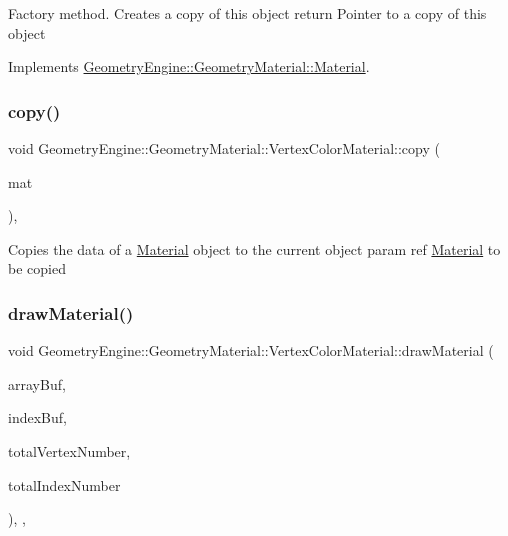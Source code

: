 Factory method. Creates a copy of this object return Pointer to a copy of this object 

Implements \mbox{\hyperlink{class_geometry_engine_1_1_geometry_material_1_1_material_ae5513ff06d536365e18ddc5e07e79784}{Geometry\+Engine\+::\+Geometry\+Material\+::\+Material}}.

\mbox{\label{class_geometry_engine_1_1_geometry_material_1_1_vertex_color_material_ab1a686f175b2e4e0f581a8535450f112}} 
\subsubsection{\texorpdfstring{copy()}{copy()}}
{\footnotesize\ttfamily void Geometry\+Engine\+::\+Geometry\+Material\+::\+Vertex\+Color\+Material\+::copy (\begin{DoxyParamCaption}\item[{const \mbox{\hyperlink{class_geometry_engine_1_1_geometry_material_1_1_vertex_color_material}{Vertex\+Color\+Material}} \&}]{mat }\end{DoxyParamCaption})\hspace{0.3cm}{\ttfamily [protected]}, {\ttfamily [virtual]}}

Copies the data of a \mbox{\hyperlink{class_geometry_engine_1_1_geometry_material_1_1_material}{Material}} object to the current object param ref \mbox{\hyperlink{class_geometry_engine_1_1_geometry_material_1_1_material}{Material}} to be copied \mbox{\label{class_geometry_engine_1_1_geometry_material_1_1_vertex_color_material_af03191da84c84c45af91405f3cba3b5d}} 
\subsubsection{\texorpdfstring{drawMaterial()}{drawMaterial()}}
{\footnotesize\ttfamily void Geometry\+Engine\+::\+Geometry\+Material\+::\+Vertex\+Color\+Material\+::draw\+Material (\begin{DoxyParamCaption}\item[{Q\+Open\+G\+L\+Buffer $\ast$}]{array\+Buf,  }\item[{Q\+Open\+G\+L\+Buffer $\ast$}]{index\+Buf,  }\item[{unsigned int}]{total\+Vertex\+Number,  }\item[{unsigned int}]{total\+Index\+Number }\end{DoxyParamCaption})\hspace{0.3cm}{\ttfamily [override]}, {\ttfamily [protected]}, {\ttfamily [virtual]}}

